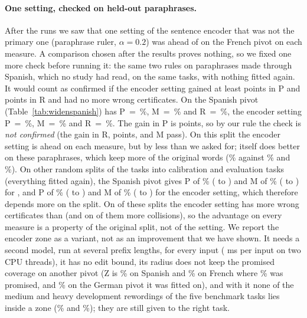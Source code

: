 \paragraph{One setting, checked on held-out paraphrases.} After the runs we saw that one setting of the sentence
encoder that was not the primary one (paraphrase ruler, $\alpha = 0.2$) was ahead of \cert{} on the French pivot
on each measure. A comparison chosen after the results proves nothing, so we fixed one more check before running it: the same two
rules on paraphrases made through Spanish, which no study had read, on the same \WidenTasksEval{} tasks, with nothing fitted again.
It would count as confirmed if the encoder setting gained at least \WidenSpAskP{} points in \textsf{P} and \WidenSpAskR{} points in \textsf{R}
and had no more wrong certificates. On the Spanish pivot (Table~\ref{tab:widenspanish}) \cert{} has
\textsf{P}~=~\WidenRefTfiveEsP{}\%, \textsf{M}~=~\WidenRefTfiveEsM{}\% and \textsf{R}~=~\WidenRefTfiveEsR{}\%, the encoder setting \textsf{P}~=~\WidenSpEncEsP{}\%,
\textsf{M}~=~\WidenSpEncEsM{}\% and \textsf{R}~=~\WidenSpEncEsR{}\%. The gain in \textsf{P} is \WidenSpGainP{} points, so by our rule the check is \emph{not
confirmed} (the gain in \textsf{R}, \WidenSpGainR{} points, and \textsf{M} pass). On this split the encoder setting is ahead on each measure, but by less than we
asked for; \cert{} itself does better on these paraphrases, which keep more of the original words
(\WidenSpKept{}\% against \WidenKeptDe{}\% and \WidenKeptFr{}\%). On \WidenSplitCount{} other random splits of the tasks into calibration and
evaluation tasks (everything fitted again), the Spanish pivot gives \textsf{P} of \WidenSplitRulePMean{}\% (\WidenSplitRulePLow{} to
\WidenSplitRulePHigh{}) and \textsf{M} of \WidenSplitRuleMMean{}\% (\WidenSplitRuleMLow{} to \WidenSplitRuleMHigh{}) for \cert{}, and
\textsf{P} of \WidenSplitEncPMean{}\% (\WidenSplitEncPLow{} to \WidenSplitEncPHigh{}) and \textsf{M} of \WidenSplitEncMMean{}\%
(\WidenSplitEncMLow{} to \WidenSplitEncMHigh{}) for the encoder setting, which therefore depends more on the split. On \WidenSplitMoreM{} of these \WidenSplitCount{} splits the encoder setting has more wrong
certificates than \cert{} (and on \WidenSplitMoreC{} of them more collisions), so the advantage on every measure is a property
of the original split, not of the setting. We report the encoder
zone as a variant, not as an improvement that we have shown. It needs a second model, run at several prefix lengths, for every input
(\WidenEncMs{} ms per input on two CPU threads), it has no edit bound, its radius does not keep the promised coverage on another pivot (\textsf{Z} is
\WidenSpEncEsZ{}\% on Spanish and \WidenSpEncFrZ{}\% on French where \WidenSpPromise{}\% was promised, and \WidenSpEncDeZ{}\% on the German pivot it
was fitted on), and with it none of the medium and heavy development rewordings of the five benchmark tasks lies inside a zone
(\WidenSpBenchMediumZone{}\% and \WidenSpBenchHeavyZone{}\%); they are still given to the right task.

